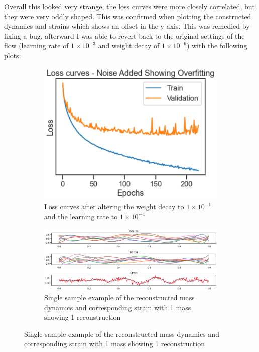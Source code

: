 \documentclass[a4paper, 12pt]{article}
\begin{document}
\begin{figure}[H]
\end{figure}

Overall this looked very strange, the loss curves were more closely correlated, but they were very oddly shaped. This was confirmed when plotting the constructed dynamics and strains which shows an offset in the y axis. This was remedied by fixing a bug, afterward I was able to revert back to the original settings of the flow (learning rate of $1 \times 10^{-3}$ and weight decay of $1 \times 10^{-6}$) with the following plots:

\begin{figure}[H]
\begin{subfigure}{.5\textwidth}
    \centering
    \includegraphics[width=1\textwidth, scale = 0.5]{Overfit.PNG}
    \caption{Loss curves after altering the weight decay to $1 \times 10^{-1}$ and the learning rate to $1 \times 10^{-4}$}
    \label{fig:lc2}
\end{subfigure} \hfill
\begin{subfigure}{.4\textwidth}
    \centering
    \includegraphics[width=1.1\textwidth, scale = 0.5]{rec1center.PNG}
    \caption{Single sample example of the reconstructed mass dynamics and corresponding strain with 1 mass showing 1 reconstruction}

\end{subfigure}
\end{figure}
\end{document}
